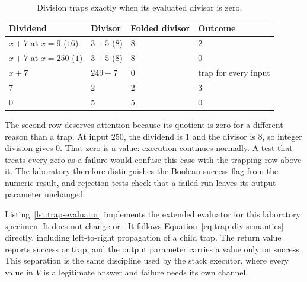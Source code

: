 \begin{table}
  \centering
  \caption{Division traps exactly when its evaluated divisor is zero.}
  \label{tab:trap-div-cases}
  \begin{tabular}{llll}
    \toprule
    Dividend & Divisor & Folded divisor & Outcome \\
    \midrule
    $x+7$ at $x=9$ ($16$) & $3+5$ ($8$) & $8$ & $2$ \\
    $x+7$ at $x=250$ ($1$) & $3+5$ ($8$) & $8$ & $0$ \\
    $x+7$ & $249+7$ & $0$ & $\text{trap}$ for every input \\
    $7$ & $2$ & $2$ & $3$ \\
    $0$ & $5$ & $5$ & $0$ \\
    \bottomrule
  \end{tabular}
\end{table}

The second row deserves attention because its quotient is zero for a different reason than a trap.
At input $250$, the dividend is $1$ and the divisor is $8$, so integer division gives $0$.
That zero is a value: execution continues normally.
A test that treats every zero as a failure would confuse this case with the trapping row above it.
The laboratory therefore distinguishes the Boolean success flag from the numeric result, and rejection tests check that a failed run leaves its output parameter unchanged.

Listing~\ref{lst:trap-evaluator} implements the extended evaluator for this laboratory specimen.
It does not change  or .
It follows Equation~\ref{eq:trap-div-semantics} directly, including left-to-right propagation of a child trap.
The return value reports success or trap, and the output parameter carries a value only on success.
This separation is the same discipline used by the stack executor, where every value in $V$ is a legitimate answer and failure needs its own channel.

\begin{listing}
  \inputminted[firstline=19,lastline=48]{c}{example-code/ch01/trap_lab.c}
  \caption{The laboratory evaluator propagates traps left to right.}
  \label{lst:trap-evaluator}
\end{listing}

